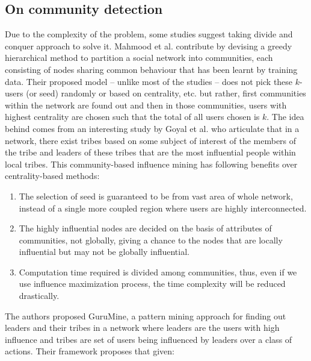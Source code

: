 		\subsection{On community detection}
		Due to the complexity of the problem, some studies suggest taking divide and conquer approach to solve it. Mahmood et al. \cite{mehmood2013} contribute by devising a greedy hierarchical method to partition a social network into communities, each consisting of nodes sharing common behaviour that has been learnt by training data. Their proposed model -- unlike most of the studies -- does not pick these $k$-users (or seed) randomly or based on centrality, etc. but rather, first communities within the network are found out and then in those communities, users with highest centrality are chosen such that the total of all users chosen is $k$. The idea behind comes from an interesting study by Goyal et al. \cite{goyal2009} who articulate that in a network, there exist tribes based on some subject of interest of the members of the tribe and leaders of these tribes that are the most influential people within local tribes. This community-based influence mining has following benefits over centrality-based methods:
		
		\begin{enumerate}
			\item The selection of seed is guaranteed to be from vast area of whole network, instead of a single more coupled region where users are highly interconnected.
			
			\item The highly influential nodes are decided on the basis of attributes of communities, not globally, giving a chance to the nodes that are locally influential but may not be globally influential.
			
			\item Computation time required is divided among communities, thus, even if we use influence maximization process, the time complexity will be reduced drastically.
		\end{enumerate}
	
		The authors proposed GuruMine, a pattern mining approach \cite{goyal2009} for finding out leaders and their tribes in a network where leaders are the users with high influence and tribes are set of users being influenced by leaders over a class of actions. Their framework proposes that given:
		
